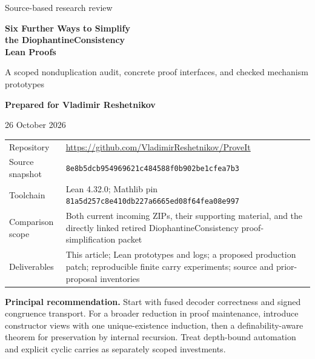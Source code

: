 \documentclass[11pt]{article}
\theoremstyle{remark}\newtheorem{remark}[theorem]{Remark}
\newcommand{\code}[1]{\nolinkurl{#1}}
\newcommand{\repo}{\url{https://github.com/VladimirReshetnikov/ProveIt}}
\newcommand{\pin}{\code{8e8b5dcb954969621c484588f0b902be1cfea7b3}}
\begin{document}
\begin{titlepage}
\vspace*{14mm}
{\Large\color{accent} Source-based research review}\par
\vspace{8mm}
{\Huge\bfseries\color{ink} Six Further Ways to Simplify\\[2mm]
the DiophantineConsistency\\[2mm]Lean Proofs}\par
\vspace{8mm}
{\Large A scoped nonduplication audit, concrete proof interfaces, and checked mechanism prototypes}\par
\vspace{16mm}
\textbf{Prepared for Vladimir Reshetnikov}\par
26 October 2026\par
\vspace{10mm}
\begin{tabular}{@{}P{32mm}P{118mm}@{}}
Repository & \repo\\[4pt]
Source snapshot & \pin\\[4pt]
Toolchain & Lean 4.32.0; Mathlib pin \code{81a5d257c8e410db227a6665ed08f64fea08e997}\\[4pt]
Comparison scope & Both current incoming ZIPs, their supporting material, and the directly linked retired DiophantineConsistency proof-simplification packet\\[4pt]
Deliverables & This article; Lean prototypes and logs; a proposed production patch; reproducible finite carry experiments; source and prior-proposal inventories
\end{tabular}
\vfill
\textbf{Principal recommendation.} Start with fused decoder correctness and signed congruence transport. For a broader reduction in proof maintenance, introduce constructor views with one unique-existence induction, then a definability-aware theorem for preservation by internal recursion. Treat depth-bound automation and explicit cyclic carries as separately scoped investments.
\end{titlepage}
\end{document}
